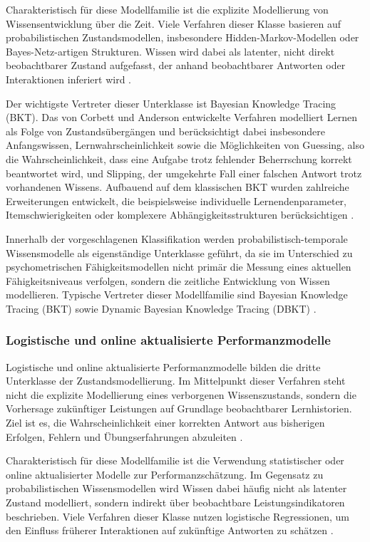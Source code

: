 Charakteristisch für diese Modellfamilie ist die explizite Modellierung
von Wissensentwicklung über die Zeit. Viele Verfahren dieser Klasse
basieren auf probabilistischen Zustandsmodellen, insbesondere
Hidden-Markov-Modellen oder Bayes-Netz-artigen Strukturen. Wissen wird
dabei als latenter, nicht direkt beobachtbarer Zustand aufgefasst, der
anhand beobachtbarer Antworten oder Interaktionen inferiert wird
\citep{Shen2024}.

Der wichtigste Vertreter dieser Unterklasse ist Bayesian Knowledge
Tracing (BKT). Das von Corbett und Anderson entwickelte Verfahren
modelliert Lernen als Folge von Zustandsübergängen und berücksichtigt
dabei insbesondere Anfangswissen, Lernwahrscheinlichkeit sowie die
Möglichkeiten von Guessing, also die Wahrscheinlichkeit, dass eine
Aufgabe trotz fehlender Beherrschung korrekt beantwortet wird, und
Slipping, der umgekehrte Fall einer falschen Antwort trotz vorhandenen
Wissens. Aufbauend auf dem klassischen BKT wurden zahlreiche
Erweiterungen entwickelt, die beispielsweise individuelle
Lernendenparameter, Itemschwierigkeiten oder komplexere
Abhängigkeitsstrukturen berücksichtigen
\citep{Shen2024, Abdelrahman2023}.

Innerhalb der vorgeschlagenen Klassifikation werden
probabilistisch-temporale Wissensmodelle als eigenständige Unterklasse
geführt, da sie im Unterschied zu psychometrischen Fähigkeitsmodellen
nicht primär die Messung eines aktuellen Fähigkeitsniveaus verfolgen,
sondern die zeitliche Entwicklung von Wissen modellieren. Typische
Vertreter dieser Modellfamilie sind Bayesian Knowledge Tracing (BKT)
sowie Dynamic Bayesian Knowledge Tracing (DBKT)
\citep{Shen2024, Abdelrahman2023}.

\subsubsection{Logistische und online aktualisierte
Performanzmodelle}\label{logistische-und-online-aktualisierte-performanzmodelle}

Logistische und online aktualisierte Performanzmodelle bilden die dritte
Unterklasse der Zustandsmodellierung. Im Mittelpunkt dieser Verfahren
steht nicht die explizite Modellierung eines verborgenen
Wissenszustands, sondern die Vorhersage zukünftiger Leistungen auf
Grundlage beobachtbarer Lernhistorien. Ziel ist es, die
Wahrscheinlichkeit einer korrekten Antwort aus bisherigen Erfolgen,
Fehlern und Übungserfahrungen abzuleiten \citep{Pelanek2017, Shen2024}.

Charakteristisch für diese Modellfamilie ist die Verwendung
statistischer oder online aktualisierter Modelle zur
Performanzschätzung. Im Gegensatz zu probabilistischen Wissensmodellen
wird Wissen dabei häufig nicht als latenter Zustand modelliert, sondern
indirekt über beobachtbare Leistungsindikatoren beschrieben. Viele
Verfahren dieser Klasse nutzen logistische Regressionen, um den Einfluss
früherer Interaktionen auf zukünftige Antworten zu schätzen
\citep{Pelanek2017, Shen2024}.

